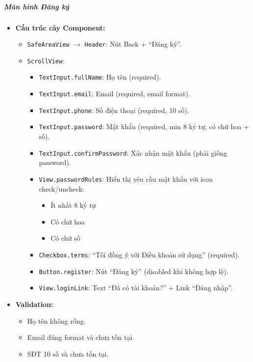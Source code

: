 \subparagraph{Màn hình Đăng ký}
\begin{itemize}
    \item \textbf{Cấu trúc cây Component:}
        \begin{itemize}
            \item \texttt{SafeAreaView} $\rightarrow$ \texttt{Header}: Nút Back + ``Đăng ký''.
            \item \texttt{ScrollView}:
                \begin{itemize}
                    \item \texttt{TextInput.fullName}: Họ tên (required).
                    \item \texttt{TextInput.email}: Email (required, email format).
                    \item \texttt{TextInput.phone}: Số điện thoại (required, 10 số).
                    \item \texttt{TextInput.password}: Mật khẩu (required, min 8 ký tự, có chữ hoa + số).
                    \item \texttt{TextInput.confirmPassword}: Xác nhận mật khẩu (phải giống password).
                    \item \texttt{View.passwordRules}: Hiển thị yêu cầu mật khẩu với icon check/uncheck:
                        \begin{itemize}
                            \item Ít nhất 8 ký tự
                            \item Có chữ hoa
                            \item Có chữ số
                        \end{itemize}
                    \item \texttt{Checkbox.terms}: ``Tôi đồng ý với Điều khoản sử dụng'' (required).
                    \item \texttt{Button.register}: Nút ``Đăng ký'' (disabled khi không hợp lệ).
                    \item \texttt{View.loginLink}: Text ``Đã có tài khoản?'' + Link ``Đăng nhập''.
                \end{itemize}
        \end{itemize}
    \item \textbf{Validation:}
        \begin{itemize}
            \item Họ tên không rỗng.
            \item Email đúng format và chưa tồn tại.
            \item SĐT 10 số và chưa tồn tại.

\end{itemize}
\end{itemize}
